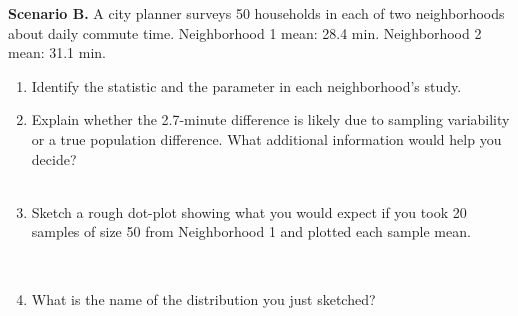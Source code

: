 \documentclass[10pt]{article}
\begin{document}
\begin{tcolorbox}[colback=redbg, colframe=black!40, boxrule=0.6pt, arc=2mm,
    left=3mm, right=3mm, top=2mm, bottom=2mm, title=\textbf{Tier A --- Approaching Proficiency}]
\textbf{Scenario B.} A city planner surveys 50 households in each of two
neighborhoods about daily commute time. Neighborhood 1 mean: 28.4 min.
Neighborhood 2 mean: 31.1 min.

\begin{enumerate}
  \item Identify the statistic and the parameter in each neighborhood's study.
        \\
  \item Explain whether the 2.7-minute difference is likely due to sampling variability
        or a true population difference. What additional information would help you
        decide? \\
        \\
  \item Sketch a rough dot-plot showing what you would expect if you took 20 samples of
        size 50 from Neighborhood 1 and plotted each sample mean.

        \par\vspace{-\parskip}\nointerlineskip\noindent\begin{minipage}[t][1.0in][t]{\linewidth}\vspace*{2pt}\\
        \end{minipage}
  \item What is the name of the distribution you just sketched? 
\end{enumerate}
\end{tcolorbox}

\vspace{0.1in}
\end{document}
